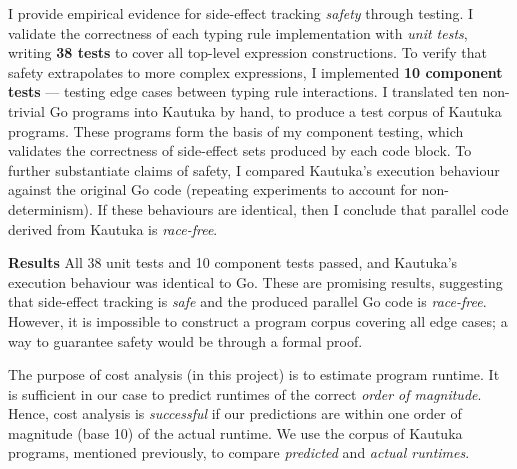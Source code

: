 I provide empirical evidence for side-effect tracking \textit{safety} through testing. I validate the correctness of each typing rule implementation with \textit{unit tests}, writing \textbf{38 tests} to cover all top-level expression constructions. To verify that safety extrapolates to more complex expressions, I implemented \textbf{10 component tests} --- testing edge cases between typing rule interactions. I translated ten non-trivial Go programs into Kautuka by hand, to produce a test corpus of Kautuka programs. These programs form the basis of my component testing, which validates the correctness of side-effect sets produced by each code block. To further substantiate claims of safety, I compared Kautuka's execution behaviour against the original Go code (repeating experiments to account for non-determinism). If these behaviours are identical, then I conclude that parallel code derived from Kautuka is \textit{race-free}.

\textbf{Results} All 38 unit tests and 10 component tests passed, and Kautuka's execution behaviour was identical to Go. These are promising results, suggesting that side-effect tracking is \textit{safe} and the produced parallel Go code is \textit{race-free}. However, it is impossible to construct a program corpus covering all edge cases; a way to guarantee safety would be through a formal proof.

The purpose of cost analysis (in this project) is to estimate program runtime. It is sufficient in our case to predict runtimes of the correct \textit{order of magnitude}. Hence, cost analysis is \textit{successful} if our predictions are within one order of magnitude (base 10) of the actual runtime. We use the corpus of Kautuka programs, mentioned previously, to compare \textit{predicted} and \textit{actual runtimes}.

\mydata


